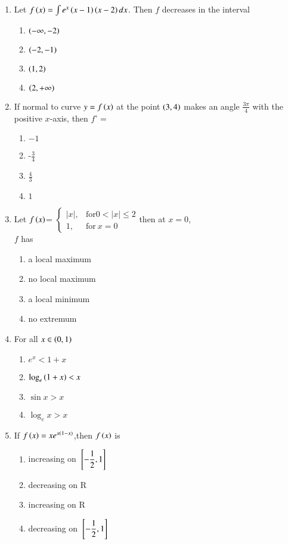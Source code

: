 \documentclass[journal,12pt,twocolumn]{IEEEtran}
\theoremstyle{remark}
\begin{document}
\begin{enumerate}[start=9]
\item Let $f\left(x\right)=\int e^x\left(x-1\right)\left(x-2\right)dx$. Then $f$ decreases in the interval 
\hfill {}
\begin{enumerate}
	\item $\left(-\infty,-2\right)$
	\item $\left(-2,-1\right)$
	\item $\left(1,2\right)$
	\item $\left(2,+\infty\right)$\\
\end{enumerate}
\item If normal to curve $y=f\left(x\right)$ at the point $\left(3,4\right)$ makes an angle $\displaystyle\frac{3\pi}{4}$ with the positive $x$-axis, then $f$' = \hfill{}
\begin{enumerate}
    \item $-1$
    \item -$\displaystyle\frac{3}{4}$\\
    \item $\displaystyle\frac{4}{3}$
    \item $1$
\end{enumerate}
\item Let $f\left(x\right)$=
$\begin{cases}
|x|, & \text{for}  0<|x| \leq 2\\ 
1, & \text{for}\  x=0
\end{cases}$then at $x=0$, \\$f$ has
\hfill {}
\begin{enumerate}
    \item a local maximum
    \item no local maximum
    \item a local minimum
    \item no extremum\\
\end{enumerate}
\item For all $x\in\left(0,1\right)$
\hfill {}
\begin{enumerate}
    \item $e^x <1+x$
    \item $\log_e \left(1+x\right) < x$
    \item$\sin{x} > x$
    \item$\log_e{x} > x $\\
\end{enumerate}
\item If $f\left(x\right)=xe^{x\left(1-x\right)}$,then $f\left(x\right)$ is 
\hfill {}
\begin{enumerate}
    \item increasing on ${}\left[-\displaystyle\frac{1}{2},1\right]$\\
    \item decreasing on R
    \item increasing on R
    \item decreasing on ${}\left[-\displaystyle\frac{1}{2},1\right]$\\
\end{enumerate}


\end{enumerate}
\end{document}
